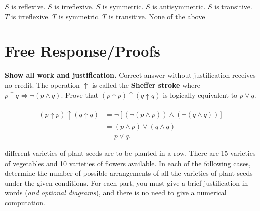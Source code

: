 \documentclass[10pt, addpoints]{exam}
\theoremstyle{definition}
\begin{document}
\begin{questions}
\begin{parts}
\begin{choices}
\CorrectChoice $S$ is reflexive. %
\choice $S$ is irreflexive. %
\CorrectChoice $S$ is symmetric. %
\choice $S$ is antisymmetric. %
\choice $S$ is transitive. %
\choice $T$ is irreflexive. %
\choice $T$ is symmetric. %
\CorrectChoice $T$ is transitive. %
\choice None of the above
\end{choices}
%
\vfill


\end{parts}


\newpage
\section*{Free Response/Proofs}
\noindent
\textbf{Show all work and justification.} Correct answer without justification receives no credit.
\question[4] 
The operation $\uparrow$ is called the \textbf{Sheffer stroke} where $p \uparrow q \iff \neg(p\wedge q)$. 
Prove that $(p\uparrow p)\uparrow (q\uparrow q)$ is logically equivalent to $p\vee q$. 
\begin{solution}
 \begin{align*}
 (p\uparrow p)\uparrow (q\uparrow q) & = \neg[(\neg(p\wedge p))\wedge(\neg(q\wedge q))]\\
 & = (p\wedge p) \vee (q\wedge q)\\
 &= p\vee q.
 \end{align*}
\end{solution}

\newpage
 different varieties of plant seeds are to be planted in a row. There are 15 varieties of vegetables and 10 varieties of flowers available. In each of the following cases, determine the number of possible arrangements of all the varieties of plant seeds under the given conditions.  For each part, you must give a brief justification in words (\textit{and optional diagrams}), and there is no need to give a numerical computation.
\end{questions}
\end{document}
